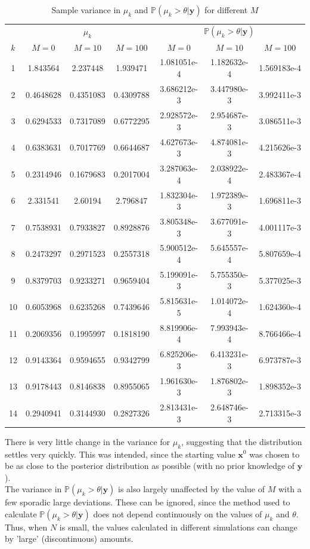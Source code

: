 \documentclass[10pt,a4paper,notitlepage]{article}
\newcommand{\p}{\mathbb{P}}
\newcommand{\x}{\mathbf{x}}
\newcommand{\y}{\mathbf{y}}
\begin{document}
\begin{table}[H]
\centering
\begin{tabular}{c|ccc|ccc|}
\cline{2-7}
 & \multicolumn{3}{c}{$\mu_{k}$} \vline &  \multicolumn{3}{c}{$\p(\mu_{k}>\theta|\y)$}\vline \\ \cline{2-7}
$k$&$M=0$&$M=10$&$M=100$ & $M=0$ & $M=10$ & $M=100$\\ \hline
1 & 1.843564 & 2.237448 & 1.939471 & 1.081051e-4 & 1.182632e-4 & 1.569183e-4\\ 
2 & 0.4648628 & 0.4351083 & 0.4309788 & 3.686212e-3 & 3.447980e-3 & 3.992411e-3\\ 
3 & 0.6294533 & 0.7317089 & 0.6772295 & 2.928572e-3 & 2.954687e-3 & 3.086511e-3\\ 
4 & 0.6383631 & 0.7017769 & 0.6644687 & 4.627673e-3 & 4.874081e-3 & 4.215626e-3\\ 
5 & 0.2314946 & 0.1679683 & 0.2017004 & 3.287063e-4 & 2.038922e-4 & 2.483367e-4\\ 
6 & 2.331541 & 2.60194 & 2.796847 & 1.832304e-3 & 1.972389e-3 & 1.696811e-3\\ 
7 & 0.7538931 & 0.7933827 & 0.8928876 & 3.805348e-3 & 3.677091e-3 & 4.001117e-3\\ 
8 & 0.2473297 & 0.2971523 & 0.2557318 & 5.900512e-4 & 5.645557e-4 & 5.807659e-4\\ 
9 & 0.8379703 & 0.9233271 & 0.9659404 & 5.199091e-3 & 5.755350e-3 & 5.377025e-3\\ 
10 & 0.6053968 & 0.6235268 & 0.7439646 & 5.815631e-5 & 1.014072e-4 & 1.624360e-4\\ 
11 & 0.2069356 & 0.1995997 & 0.1818190 & 8.819906e-4 & 7.993943e-4 & 8.766466e-4\\ 
12 & 0.9143364 & 0.9594655 & 0.9342799 & 6.825206e-3 & 6.413231e-3 & 6.973787e-3\\ 
13 & 0.9178443 & 0.8146838 & 0.8955065 & 1.961630e-3 & 1.876802e-3 & 1.898352e-3\\ 
14 & 0.2940941 & 0.3144930 & 0.2827326 & 2.813431e-3 & 2.648746e-3 & 2.713315e-3\\ \hline
\end{tabular}
\caption{Sample variance in $\mu_{k}$ and $\p(\mu_{k}>\theta|\y)$ for different $M$}\label{tb:4}
\end{table}
There is very little change in the variance for $\mu_{k}$, suggesting that the distribution settles very quickly. This was intended, since the starting value $\x^{0}$ was chosen to be as close to the posterior distribution as possible (with no prior knowledge of $\y$). \\
The variance in $\p(\mu_{k}>\theta|\y)$ is also largely unaffected by the value of $M$ with a few sporadic large deviations. These can be ignored, since the method used to calculate $\p(\mu_{k}>\theta|\y)$ does not depend continuously on the values of $\mu_{k}$ and $\theta$. Thus, when $N$ is small,  the values calculated in different simulations can change by 'large' (discontinuous) amounts.
\end{document}
